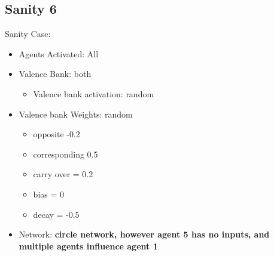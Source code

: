 \documentclass{article}\usepackage[]{graphicx}\usepackage[]{color}
\begin{document}
\subsection{Sanity 6}
\label{sec:sanity6}
Sanity Case:
\begin{itemize}
  \item Agents Activated: All
  \item Valence Bank: both
  \begin{itemize}
      \item Valence bank activation: random
  \end{itemize}
  \item Valence bank Weights: random
  \begin{itemize}
      \item opposite -0.2
      \item corresponding 0.5
      \item carry over = 0.2
      \item bias = 0
      \item decay = -0.5
  \end{itemize}
  \item Network: \textbf{circle network, however agent 5 has no inputs, and multiple agents influence agent 1}
\end{itemize}
\end{document}
